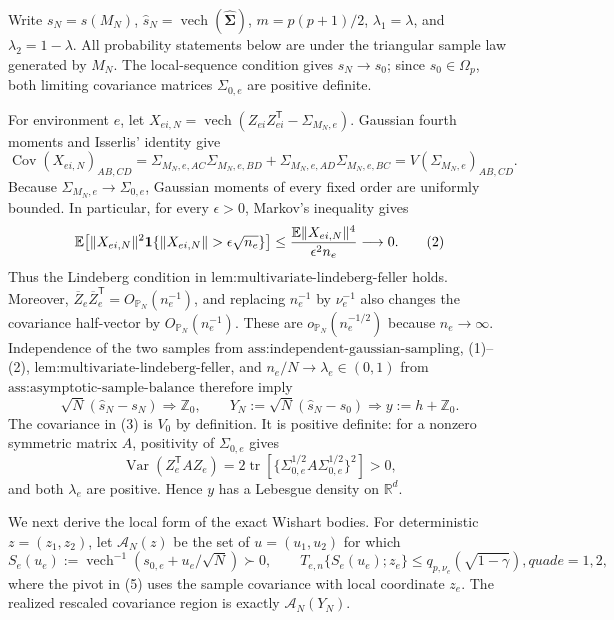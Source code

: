 Write \(s_N=s(M_N)\), \(\widehat s_N=\operatorname{vech}(\widehat{\boldsymbol\Sigma})\), \(m=p(p+1)/2\), \(\lambda_1=\lambda\), and \(\lambda_2=1-\lambda\).  All probability statements below are under the triangular sample law generated by \(M_N\).  The local-sequence condition gives \(s_N\to s_0\); since \(s_0\in\Omega_p\), both limiting covariance matrices \(\Sigma_{0,e}\) are positive definite.

For environment \(e\), let \(X_{ei,N}=\operatorname{vech}(Z_{ei}Z_{ei}^{\mathsf T}-\Sigma_{M_N,e})\).  Gaussian fourth moments and Isserlis' identity give
\[
 \operatorname{Cov}(X_{ei,N})_{AB,CD}
 =\Sigma_{M_N,e,AC}\Sigma_{M_N,e,BD}
  +\Sigma_{M_N,e,AD}\Sigma_{M_N,e,BC}
 =V(\Sigma_{M_N,e})_{AB,CD}.
 \tag{1}
\]
Because \(\Sigma_{M_N,e}\to\Sigma_{0,e}\), Gaussian moments of every fixed order are uniformly bounded.  In particular, for every \(\epsilon>0\), Markov's inequality gives
\[
 \mathbb E\!\left[
 \lVert X_{ei,N}\rVert^2
 {\bf1}\{\lVert X_{ei,N}\rVert>\epsilon\sqrt{n_e}\}
 \right]
 \le \frac{\mathbb E\lVert X_{ei,N}\rVert^4}{\epsilon^2n_e}
 \longrightarrow0.
 \tag{2}
\]
Thus the Lindeberg condition in \(\text{lem:multivariate-lindeberg-feller}\) holds.  Moreover, \(\overline Z_e\overline Z_e^{\mathsf T}=O_{\mathbb P_N}(n_e^{-1})\), and replacing \(n_e^{-1}\) by \(\nu_e^{-1}\) also changes the covariance half-vector by \(O_{\mathbb P_N}(n_e^{-1})\).  These are \(o_{\mathbb P_N}(n_e^{-1/2})\) because \(n_e\to\infty\).  Independence of the two samples from \(\text{ass:independent-gaussian-sampling}\), (1)--(2), \(\text{lem:multivariate-lindeberg-feller}\), and \(n_e/N\to\lambda_e\in(0,1)\) from \(\text{ass:asymptotic-sample-balance}\) therefore imply
\[
 \sqrt N(\widehat s_N-s_N)\Rightarrow\mathbb Z_0,
 \qquad
 Y_N:=\sqrt N(\widehat s_N-s_0)
 \Rightarrow y:=h+\mathbb Z_0.
 \tag{3}
\]
The covariance in (3) is \(V_0\) by definition.  It is positive definite: for a nonzero symmetric matrix \(A\), positivity of \(\Sigma_{0,e}\) gives
\[
 \operatorname{Var}(Z_e^{\mathsf T}AZ_e)
 =2\operatorname{tr}\!\left[
   \{\Sigma_{0,e}^{1/2}A\Sigma_{0,e}^{1/2}\}^2
 \right]>0,
 \tag{4}
\]
and both \(\lambda_e\) are positive.  Hence \(y\) has a Lebesgue density on \(\mathbb R^d\).

We next derive the local form of the exact Wishart bodies.  For deterministic \(z=(z_1,z_2)\), let \(\mathcal A_N(z)\) be the set of \(u=(u_1,u_2)\) for which
\[
 S_e(u_e):=\operatorname{vech}^{-1}(s_{0,e}+u_e/\sqrt N)\succ0,
 \qquad
 T_{e,n}\{S_e(u_e);z_e\}
 \le q_{p,\nu_e}(\sqrt{1-\gamma}),quad e=1,2,
 \tag{5}
\]
where the pivot in (5) uses the sample covariance with local coordinate \(z_e\).  The realized rescaled covariance region is exactly \(\mathcal A_N(Y_N)\).

